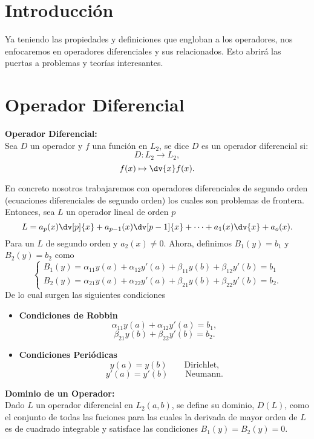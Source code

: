 \section*{Introducción}
Ya teniendo las propiedades y definiciones que engloban a los operadores, nos enfocaremos en operadores diferenciales y sus relacionados. Esto abrirá las puertas a problemas y teorías interesantes.


\section*{Operador Diferencial}




\begin{mdframed}[style=warning]
	{\Large \textbf{Operador Diferencial:}} \\
	Sea $D$ un operador y $f$ una función en $L_2$, se dice $D$ es un operador diferencial si:
	$$ D:L_2 \to L_2, $$
	$$ f(x) \mapsto \dv{x} f(x). $$
\end{mdframed}

En concreto nosotros trabajaremos con operadores diferenciales de segundo orden (ecuaciones diferenciales de segundo orden) los cuales son problemas de frontera. Entonces, sea $L$ un operador lineal de orden $p$
	$$ L = a_p (x) \dv[p]{x} + a_{p - 1} (x) \dv[p - 1]{x} + \cdots + a_1 (x) \dv{x} + a_o (x). $$
Para un $L$ de segundo orden y $a_2 (x) \neq 0$. Ahora, definimos $B_1 (y) = b_1$ y $B_2 (y) = b_2$ como
	$$ 
		\left\{\begin{array}{c}
			B_1 (y) = \alpha _{11} y(a) + \alpha _{12} y'(a) + \beta _{11} y(b) + \beta _{12} y'(b) = b_1 \\
			B_2 (y) = \alpha _{21} y(a) + \alpha _{22} y'(a) + \beta _{21} y(b) + \beta _{22} y'(b) = b_2.
		\end{array}\right.			
	$$
De lo cual surgen las siguientes condiciones
\begin{itemize}
	\item \textbf{Condiciones de Robbin}
		$$ \alpha _{11} y(a) + \alpha _{12} y'(a) = b_1, $$
		$$ \beta _{21} y(b) + \beta _{22} y'(b) = b_2 . $$
	\item \textbf{Condiciones Periódicas}
		$$ y(a) = y(b) \qquad \text{Dirichlet,} $$
		$$ y'(a) = y'(b) \qquad \text{Neumann.} $$
\end{itemize}





\begin{mdframed}[style=warning]
	{\Large \textbf{Dominio de un Operador:}} \\
	Dado $L$ un operador diferencial en $L_2 (a,b)$, se define su dominio, $D(L)$, como el conjunto de todas las fuciones para las cuales la derivada de mayor orden de $L$ es de cuadrado integrable y satisface las condiciones $B_1 (y) = B_2 (y) = 0$.
\end{mdframed}




